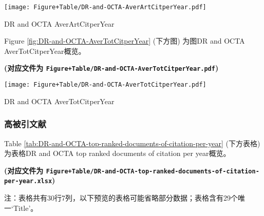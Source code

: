 \documentclass[
]{article}
\begin{document}
\def\@captype{figure}
\begin{center}
\texttt{[image: Figure+Table/DR-and-OCTA-AverArtCitperYear.pdf]}
\caption{DR and OCTA AverArtCitperYear}\label{fig:DR-and-OCTA-AverArtCitperYear}
\end{center}

Figure \ref{fig:DR-and-OCTA-AverTotCitperYear} (下方图) 为图DR and OCTA AverTotCitperYear概览。

\textbf{(对应文件为 \texttt{Figure+Table/DR-and-OCTA-AverTotCitperYear.pdf})}

\def\@captype{figure}
\begin{center}
\texttt{[image: Figure+Table/DR-and-OCTA-AverTotCitperYear.pdf]}
\caption{DR and OCTA AverTotCitperYear}\label{fig:DR-and-OCTA-AverTotCitperYear}
\end{center}

\hypertarget{ux9ad8ux88abux5f15ux6587ux732e}{%
\subsubsection{高被引文献}\label{ux9ad8ux88abux5f15ux6587ux732e}}

Table \ref{tab:DR-and-OCTA-top-ranked-documents-of-citation-per-year} (下方表格) 为表格DR and OCTA top ranked documents of citation per year概览。

\textbf{(对应文件为 \texttt{Figure+Table/DR-and-OCTA-top-ranked-documents-of-citation-per-year.xlsx})}

\begin{center}\begin{tcolorbox}[colback=gray!10, colframe=gray!50, width=0.9\linewidth, arc=1mm, boxrule=0.5pt]注：表格共有30行7列，以下预览的表格可能省略部分数据；表格含有29个唯一`Title'。
\end{tcolorbox}
\end{center}
\end{document}
